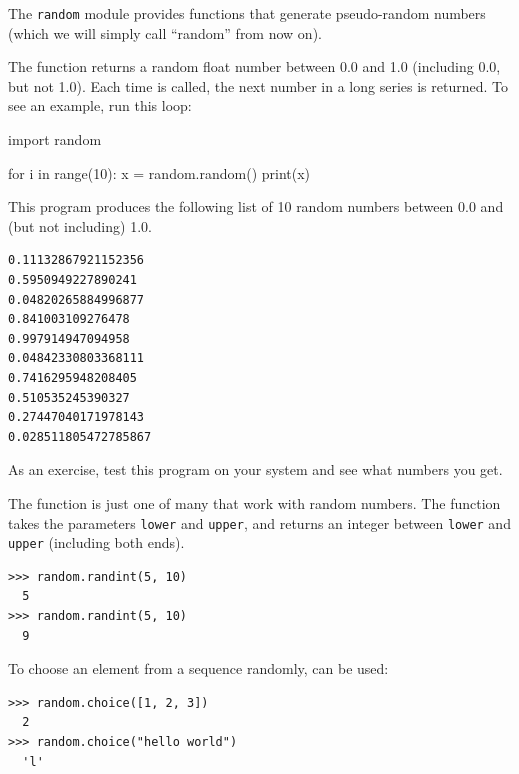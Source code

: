  

The \texttt{random} module provides functions that generate pseudo-random numbers (which we will simply call ``random'' from now on).

 

The  function returns a random float number between 0.0 and 1.0 (including 0.0, but not 1.0). Each time  is called, the next number in a long series is returned. To see an example, run this loop:

\begin{python}[frame=single]
import random

for i in range(10):
    x = random.random()
    print(x)
\end{python}

This program produces the following list of 10 random numbers between 0.0 and (but not including) 1.0.

\begin{Verbatim}[frame=single]
0.11132867921152356
0.5950949227890241
0.04820265884996877
0.841003109276478
0.997914947094958
0.04842330803368111
0.7416295948208405
0.510535245390327
0.27447040171978143
0.028511805472785867
\end{Verbatim}

As an exercise, test this program on your system and see what numbers you get.

The  function is just one of many that work with random numbers. The  function takes the parameters \texttt{lower} and \texttt{upper}, and returns an integer between \texttt{lower} and \texttt{upper} (including both ends).

 

\begin{Verbatim}[frame=single]
>>> random.randint(5, 10)
  5
>>> random.randint(5, 10)
  9
\end{Verbatim}

To choose an element from a sequence randomly,  can be used:

 

\begin{Verbatim}[frame=single]
>>> random.choice([1, 2, 3])
  2
>>> random.choice("hello world")
  'l'
\end{Verbatim}

